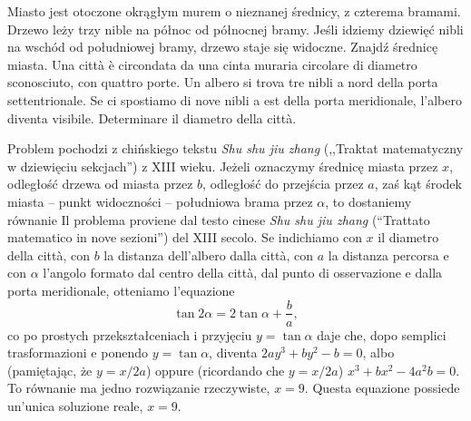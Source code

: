 \begin{problem}
    Miasto jest otoczone okrągłym murem o nieznanej średnicy, z czterema bramami. %
    Drzewo leży trzy nible na północ od północnej bramy. %
    Jeśli idziemy dziewięć nibli na wschód od południowej bramy, drzewo staje się widoczne. %
    Znajdź średnicę miasta. %
    Una città è circondata da una cinta muraria circolare di diametro sconosciuto, con quattro porte. %
    Un albero si trova tre nibli a nord della porta settentrionale. %
    Se ci spostiamo di nove nibli a est della porta meridionale, l'albero diventa visibile. %
    Determinare il diametro della città. %
\end{problem}

Problem pochodzi z chińskiego tekstu \emph{Shu shu jiu zhang} (,,Traktat matematyczny w dziewięciu sekcjach'') z XIII wieku. %
Jeżeli oznaczymy średnicę miasta przez $x$, odległość drzewa od miasta przez $b$, odległość do przejścia przez $a$, zaś kąt środek miasta -- punkt widoczności -- południowa brama przez $\alpha$, to dostaniemy równanie %
Il problema proviene dal testo cinese \emph{Shu shu jiu zhang} (``Trattato matematico in nove sezioni'') del XIII secolo. %
Se indichiamo con $x$ il diametro della città, con $b$ la distanza dell'albero dalla città, con $a$ la distanza percorsa e con $\alpha$ l'angolo formato dal centro della città, dal punto di osservazione e dalla porta meridionale, otteniamo l'equazione %
\begin{equation}
    \tan 2 \alpha = 2 \tan \alpha + \frac ba,
\end{equation}
co po prostych przekształceniach i przyjęciu $y = \tan \alpha$ daje %
che, dopo semplici trasformazioni e ponendo $y=\tan\alpha$, diventa %
$
    2ay^3 + by^2 - b = 0
$,
albo (pamiętając, że $y = x/2a$) %
oppure (ricordando che $y=x/2a$) %
$
    x^3 + bx^2 - 4a^2 b = 0
$.
To równanie ma jedno rozwiązanie rzeczywiste, $x = 9$. %
Questa equazione possiede un'unica soluzione reale, $x=9$. %

